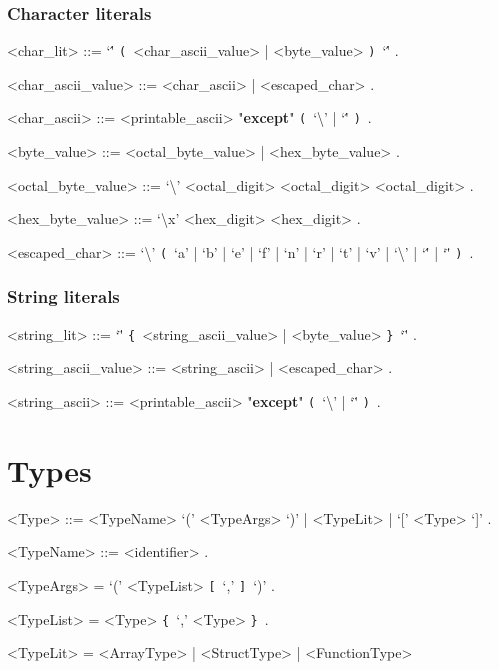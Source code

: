 \documentclass{article}
\def\lrep{\synshortsoff\texttt{\{}\synshorts~}
\def\rrep{\synshortsoff\texttt{\}}\synshorts~}
\def\lopt{\synshortsoff\texttt{[}\synshorts~}
\def\ropt{\synshortsoff\texttt{]}\synshorts~}
\def\lgrp{\synshortsoff\texttt{(}\synshorts~}
\def\rgrp{\synshortsoff\texttt{)}\synshorts~}
\begin{document}
\subsubsection*{Character literals}
\begin{grammar}
  <char_lit> ::= `\'' \lgrp <char_ascii_value> | <byte_value> \rgrp `\'' .

  <char_ascii_value> ::= <char_ascii> | <escaped_char> .

  <char_ascii> ::= <printable_ascii> "\textbf{except}" \lgrp `\textbackslash' | `\'' \rgrp .

  <byte_value> ::= <octal_byte_value> | <hex_byte_value> .

  <octal_byte_value> ::= `\textbackslash' <octal_digit> <octal_digit> <octal_digit> .

  <hex_byte_value> ::= `\textbackslash x' <hex_digit> <hex_digit> .

  <escaped_char> ::= `\textbackslash' \lgrp `a' | `b' | `e' | `f' | `n' | `r' | `t' | `v' | `\textbackslash' | `\'' | `\"' \rgrp .
\end{grammar}

\subsubsection*{String literals}
\begin{grammar}
  <string_lit> ::= `\"' \lrep <string_ascii_value> | <byte_value> \rrep `\"' .

  <string_ascii_value> ::= <string_ascii> | <escaped_char> .

  <string_ascii> ::= <printable_ascii> "\textbf{except}" \lgrp `\textbackslash' | `\"' \rgrp .
\end{grammar}


\section*{Types}
\begin{grammar}
	<Type> ::= <TypeName> `(' <TypeArgs> `)' | <TypeLit> | `[' <Type> `]' .

	<TypeName> ::= <identifier> .  %

	<TypeArgs> = `(' <TypeList> \lopt `,' \ropt `)' .

	<TypeList> = <Type> \lrep `,' <Type> \rrep .

	<TypeLit> = <ArrayType> | <StructType> | <FunctionType> 
\end{grammar}
\end{document}
